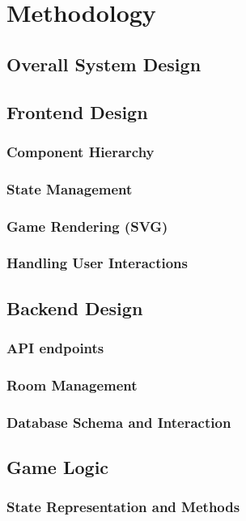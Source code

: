 \chapter{Methodology}
\section{Overall System Design}

\section{Frontend Design}
\subsection{Component Hierarchy}
\subsection{State Management}
\subsection{Game Rendering (SVG)}
\subsection{Handling User Interactions}

\section{Backend Design}
\subsection{API endpoints}
\subsection{Room Management}
\subsection{Database Schema and Interaction}

\section{Game Logic}
\subsection{State Representation and Methods}
